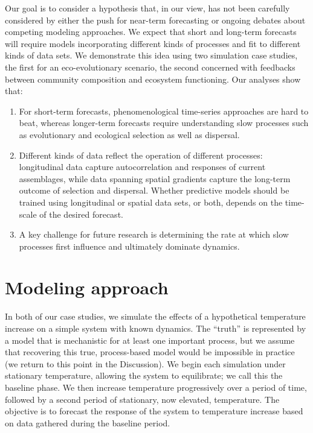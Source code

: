 \documentclass[11pt]{article}
\begin{document}
Our goal is to consider a hypothesis that, in our view, has not been carefully considered by either the push for near-term forecasting or
ongoing debates about competing modeling approaches. We expect that short and long-term forecasts will require models
incorporating different kinds of processes and fit to different kinds of data sets. We demonstrate this idea using two simulation case studies, the first for an 
eco-evolutionary scenario, the second concerned with feedbacks between community composition and ecosystem functioning. Our analyses show that: 
\begin{enumerate}
	\item For short-term forecasts, phenomenological time-series approaches are hard to beat, whereas longer-term forecasts require understanding slow 
	processes such as evolutionary and ecological selection as well as dispersal.
	\item Different kinds of data reflect the operation of different processes: longitudinal data capture autocorrelation and responses of current assemblages, while 
	data spanning spatial gradients capture the long-term outcome of selection and dispersal.  Whether predictive models should be trained using longitudinal or
	spatial data sets, or both, depends on the time-scale of the desired forecast.
	\item A key challenge for future research is determining the rate at which slow processes first influence and ultimately dominate dynamics.
\end{enumerate}

\section*{Modeling approach}

In both of our case studies, we simulate the effects of a hypothetical temperature increase on a simple system with known dynamics.
The ``truth'' is represented by a model that is mechanistic for at least one important process, but we assume that recovering 
this true, process-based model would be impossible in practice (we return to this point in the Discussion). We begin each simulation
under stationary temperature, allowing the system to equilibrate; we call this the baseline phase. We then increase temperature progressively
over a period of time, followed by a second period of stationary, now elevated, temperature. The objective is to forecast the response of the 
system to temperature increase based on data gathered during the baseline period. 
\end{document}
